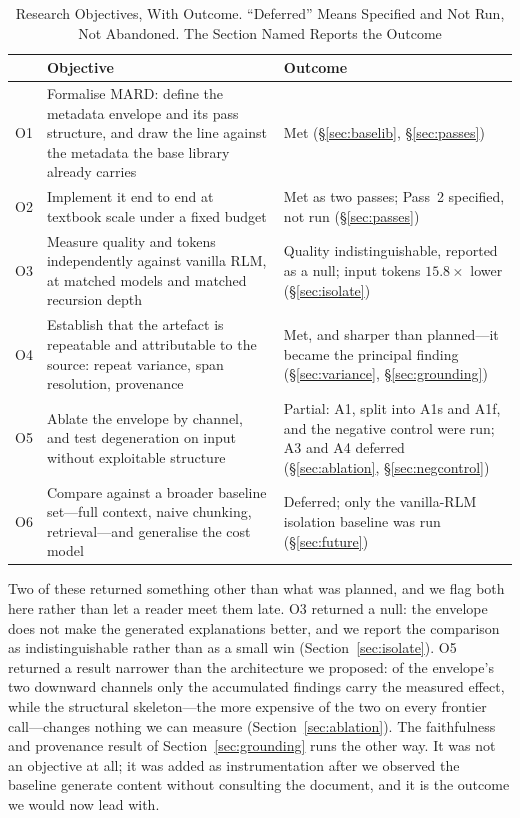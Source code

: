 \documentclass[conference]{IEEEtran}
\begin{document}
\begin{table}[!t]
\caption{Research Objectives, With Outcome. ``Deferred'' Means Specified and
Not Run, Not Abandoned. The Section Named Reports the Outcome}
\label{tab:objectives}
\centering
\renewcommand{\arraystretch}{1.2}
\begin{tabular}{@{}p{0.45cm}p{3.9cm}p{2.75cm}@{}}
\toprule
& \textbf{Objective} & \textbf{Outcome} \\
\midrule
O1 & Formalise MARD: define the metadata envelope and its pass structure,
and draw the line against the metadata the base library already carries
& Met (\S\ref{sec:baselib}, \S\ref{sec:passes}) \\
O2 & Implement it end to end at textbook scale under a fixed budget
& Met as two passes; Pass~2 specified, not run (\S\ref{sec:passes}) \\
O3 & Measure quality and tokens independently against vanilla RLM, at
matched models and matched recursion depth
& Quality indistinguishable, reported as a null; input tokens
$15.8\times$ lower (\S\ref{sec:isolate}) \\
O4 & Establish that the artefact is repeatable and attributable to the
source: repeat variance, span resolution, provenance
& Met, and sharper than planned---it became the principal finding
(\S\ref{sec:variance}, \S\ref{sec:grounding}) \\
O5 & Ablate the envelope by channel, and test degeneration on input
without exploitable structure
& Partial: A1, split into A1s and A1f, and the negative control were run;
A3 and A4 deferred (\S\ref{sec:ablation}, \S\ref{sec:negcontrol}) \\
O6 & Compare against a broader baseline set---full context, naive
chunking, retrieval---and generalise the cost model
& Deferred; only the vanilla-RLM isolation baseline was run
(\S\ref{sec:future}) \\
\bottomrule
\end{tabular}
\end{table}

Two of these returned something other than what was planned, and we flag
both here rather than let a reader meet them late. O3 returned a null: the
envelope does not make the generated explanations better, and we report the
comparison as indistinguishable rather than as a small win
(Section~\ref{sec:isolate}). O5 returned a result narrower than the
architecture we proposed: of the envelope's two downward channels only the
accumulated findings carry the measured effect, while the structural
skeleton---the more expensive of the two on every frontier call---changes
nothing we can measure (Section~\ref{sec:ablation}). The faithfulness and
provenance result of Section~\ref{sec:grounding} runs the other way. It was
not an objective at all; it was added as instrumentation after we observed
the baseline generate content without consulting the document, and it is
the outcome we would now lead with.
\end{document}
